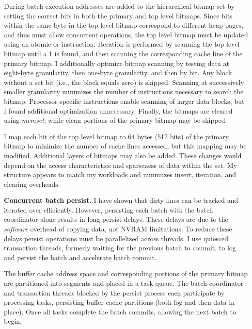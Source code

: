 During batch execution addresses are added to the hierarchical bitmap set by setting the correct bits in both the primary and top level bitmaps.
Since bits within the same byte in the top level bitmap correspond to different heap pages, and thus must allow concurrent operations, the top level bitmap must be updated using an atomic-or instruction.
Iteration is performed by scanning the top level bitmap until a 1 is found, and then scanning the corresponding cache line of the primary bitmap.
I additionally optimize bitmap scanning by testing data at eight-byte granularity, then one-byte granularity, and then by bit.
Any block without a set bit (i.e., the block equals zero) is skipped.
Scanning at successively smaller granularity minimizes the number of instructions necessary to search the bitmap.
Processor-specific instructions enable scanning of larger data blocks, but I found additional optimization unnecessary.
Finally, the bitmaps are cleared using \emph{memset}, while clean portions of the primary bitmap may be skipped.

I map each bit of the top level bitmap to 64 bytes (512 bits) of the primary bitmap to minimize the number of cache lines accessed, but this mapping may be modified.
Additional layers of bitmaps may also be added.
These changes would depend on the access characteristics and sparseness of data within the set.
My structure appears to match my workloads and minimizes insert, iteration, and clearing overheads.

\textbf{Concurrent batch persist.}
I have shown that dirty lines can be tracked and iterated over efficiently.
However, persisting each batch with the batch coordinator alone results in long persist delays.
These delays are due to the \emph{software} overhead of copying data, not NVRAM limitations.
To reduce these delays persist operations must be parallelized across threads.
I use quiesced transaction threads, formerly waiting for the previous batch to commit, to log and persist the batch and accelerate batch commit.

The buffer cache address space and corresponding portions of the primary bitmap are partitioned into segments and placed in a task queue.
The batch coordinator and transaction threads blocked by the persist process each participate by processing tasks, persisting buffer cache partitions (both log and then data in-place).
Once all tasks complete the batch commits, allowing the next batch to begin.

